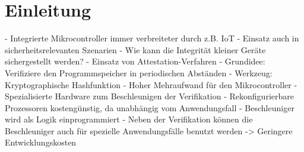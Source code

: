 \section{Einleitung}

- Integrierte Mikrocontroller immer verbreiteter durch z.B. IoT
- Einsatz auch in sicherheitsrelevanten Szenarien
- Wie kann die Integrität kleiner Geräte sichergestellt werden?
- Einsatz von Attestation-Verfahren
- Grundidee: Verifiziere den Programmspeicher in periodischen Abständen
- Werkzeug: Kryptographische Hashfunktion
- Hoher Mehraufwand für den Mikrocontroller
- Spezialisierte Hardware zum Beschleunigen der Verifikation
- Rekonfigurierbare Prozessoren kostengünstig, da unabhängig vom Anwendungsfall
- Beschleuniger wird als Logik einprogrammiert
- Neben der Verifikation können die Beschleuniger auch für spezielle Anwendungsfälle benutzt werden
-> Geringere Entwicklungskosten


